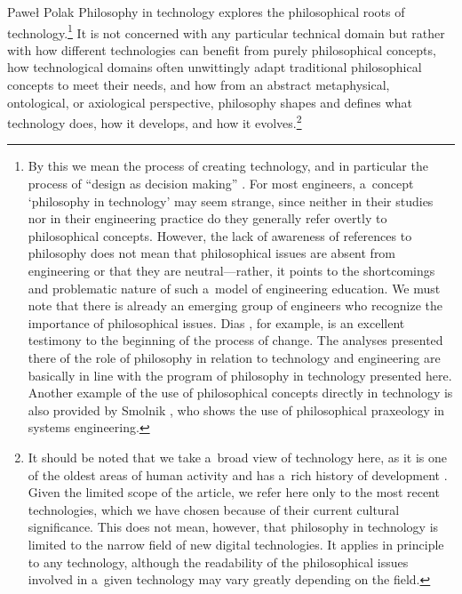\begin{artengenv}{Paweł Polak}
Philosophy in technology explores the philosophical roots of technology.\footnote{By this we mean the process of creating technology, and in particular the process of ``design as decision making'' 
\parencite[][]{franssen_philosophy_2023}. %
 For most engineers, a~concept ‘philosophy in technology' may seem strange, since neither in their studies nor in their engineering practice do they generally refer overtly to philosophical concepts. However, the lack of awareness of references to philosophy does not mean that philosophical issues are absent from engineering or that they are neutral---rather, it points to the shortcomings and problematic nature of such a~model of engineering education. We must note that there is already an emerging group of engineers who recognize the importance of philosophical issues. Dias 
\parencite*[][]{dias_philosophy_2019}, %
 for example, is an excellent testimony to the beginning of the process of change. The analyses presented there of the role of philosophy in relation to technology and engineering are basically in line with the program of philosophy in technology presented here. Another example of the use of philosophical concepts directly in technology is also provided by Smolnik 
\parencites*[][]{smolnik_comparative_2017}[][]{smolnik_praxiological_2018}, %
 who shows the use of philosophical praxeology in systems engineering.}
It is not concerned with any particular technical domain but rather with how different technologies can benefit from purely philosophical concepts, how technological domains often unwittingly adapt traditional philosophical concepts to meet their needs, and how from an abstract metaphysical, ontological, or axiological perspective, philosophy shapes and defines what technology does, how it develops, and how it evolves.\footnote{It should be noted that we take a~broad view of technology here, as it is one of the oldest areas of human activity and has a~rich history of development
 \parencites{Hughes2005HumanBuiltWorld}{Arthur2009NatureTechnology}. %
 Given the limited scope of the article, we refer here only to the most recent technologies, which we have chosen because of their current cultural significance. This does not mean, however, that philosophy in technology is limited to the narrow field of new digital technologies. It applies in principle to any technology, although the readability of the philosophical issues involved in a~given technology may vary greatly depending on the field.}




\end{artengenv}
